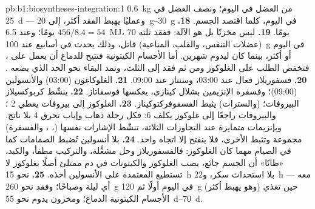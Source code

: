 \begin{solution}{pb:b1:biosyntheses-integration:1}
\qty{0.6}{kg} من العضل في اليوم؛ ونصف العضل في \qty{25}{d} ---
وعمليًا يهبط الفقد أكثر، إلى \qtyrange{20}{30}{g} في اليوم، كلما
اقتصد الجسم.
\textbf{18.} $456/8.4 = 54$ يومًا؛ وعند \qty{6.5}{MJ}، 70 يومًا.
\textbf{19.}  ليس مخزنًا بل هو الآلة: ففقد ثلثه (عضلات
التنفس، والقلب،  المناعية) قاتل، وذلك يحدث في أسابيع عند
\qty{100}{g} في اليوم أو أكثر، بينما كان  ليدوم شهرين. أما
الأجسام الكيتونية فتتيح للدماغ أن يعمل على ، فتخفض الطلب على
الغلوكوز ومن ثم فقد  إلى الثلث، وتمد البقاء نحو الحد الذي
يضعه .
\textbf{20.} فسفوريلاز  فعال عند 03:00، وسنتاز 
عند 09:00.
\textbf{21.} الغلوكاغون (03:00) والأنسولين (09:00)؛ وفسفرة الإنزيمين
بشلال كينازي، يعكسها فوسفاتاز.
\textbf{22.}  ينشّط كربوكسيلاز البيروفات؛  (والسترات)
يثبط الفسفوفركتوكيناز.
\textbf{23.} الغلوكوز إلى بيروفات يعطي 2 ؛ والبيروفات راجعًا إلى
غلوكوز يكلف 6: فكل رحلة ذهاب وإياب تحرق 4  بلا ناتج. وبإنزيمات
متمايزة عند التجاوزات الثلاثة، تنشّط الإشارات نفسها (،
، والفسفرة) مجموعة وتثبط الأخرى، فلا ينفتح إلا اتجاه
واحد.
\textbf{24.} بلا أنسولين تُضبط الصمامات كما في الصيام مهما كان
الغلوكوز: فالفسفوريلاز  وحل  مشغَّلة، والتركيب
مطفأ، والكبد، «ظانًا» أن الجسم جائع، يصب الغلوكوز والكيتونات في دم
ممتلئ أصلًا بغلوكوز لا تستطيع  المعتمدة على الأنسولين أخذه.
\textbf{25.} نحو \qty{15}{h} بلا استحداث سكر، و\qty{22}{h} معه ---
أي ليلة وصباحًا؛ وفقد  نحو \qty{260}{g} في اليوم أولًا ثم
\qty{120}{g} (وهو يهبط أكثر) حين تغذي الأجسام الكيتونية الدماغ؛
ومخزون  يدوم نحو \qtyrange{55}{70}{d}.
\end{solution}
